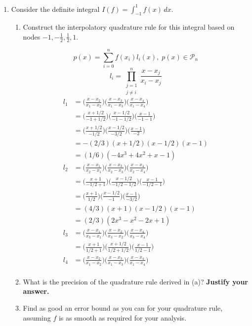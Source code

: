 \documentclass{article}
\begin{document}
\begin{enumerate}
\begin{enumerate}
        \end{enumerate}
    \newpage
    \item Consider the definite integral $I(f) = \int_{-1}^1 f(x) \,dx$.

        \begin{enumerate}
            \item Construct the interpolatory quadrature rule for this integral based on nodes $-1, -\frac{1}{2}, \frac{1}{2}, 1$.

            \[p(x) = \sum_{i=0}^n f(x_i)l_i(x),\; p(x) \in \mathcal{P}_n\]
            \[l_i = \prod_{\substack{j=1 \\ j\neq i}}^n\frac{x-x_j}{x_i-x_j} \]
            \begin{align*}
                l_1 &= \Big( \frac{x - x_2}{x_1 - x_2}\Big)\Big( \frac{x - x_3}{x_1 - x_3}\Big)\Big( \frac{x - x_4}{x_1 - x_4}\Big)\\ 
                &= \Big( \frac{x + 1/2}{-1 + 1/2}\Big)\Big( \frac{x - 1/2}{-1 - 1/2}\Big)\Big( \frac{x - 1}{-1 - 1}\Big)\\ 
                &= \Big( \frac{x + 1/2}{-1/2}\Big)\Big( \frac{x - 1/2}{- 3/2}\Big)\Big( \frac{x - 1}{-2}\Big)\\ 
                &= -(2/3) ( x + 1/2)( x - 1/2)( x - 1)\\ 
                &= (1/6) (-4x^3+4x^2+x-1)\\ 
                l_2 &= \Big( \frac{x - x_1}{x_2 - x_1}\Big)\Big( \frac{x - x_3}{x_2 - x_3}\Big)\Big( \frac{x - x_4}{x_2 - x_4}\Big)\\ 
                &= \Big( \frac{x + 1}{-1/2 + 1}\Big)\Big( \frac{x - 1/2}{-1/2 - 1/2}\Big)\Big( \frac{x - 1}{-1/2 - 1}\Big)\\ 
                &= \Big( \frac{x + 1}{1/2}\Big)\Big( \frac{x - 1/2}{-1}\Big)\Big( \frac{x - 1}{-3/2}\Big)\\ 
                &= (4/3)( x + 1)(x - 1/2)(x - 1)\\ 
                &= (2/3)(2x^3-x^2-2x+1)\\ 
                l_3 &= \Big( \frac{x - x_1}{x_3 - x_1}\Big)\Big( \frac{x - x_2}{x_3 - x_2}\Big)\Big( \frac{x - x_4}{x_3 - x_4}\Big)\\ 
                &= \Big( \frac{x + 1}{1/2 + 1}\Big)\Big( \frac{x + 1/2}{1/2 + 1/2}\Big)\Big( \frac{x - 1}{1/2 - 1}\Big)\\ 
                l_4 &= \Big( \frac{x - x_2}{x_1 - x_2}\Big)\Big( \frac{x - x_3}{x_1 - x_3}\Big)\Big( \frac{x - x_4}{x_1 - x_4}\Big)\\ 
            \end{align*}

            \item What is the precision of the quadrature rule derived in (a)? \textbf{Justify your answer.}
            \item Find as good an error bound as you can for your quadrature rule, assuming $f$ is as smooth as required for your analysis.
        \end{enumerate}
\end{enumerate}
\end{document}
